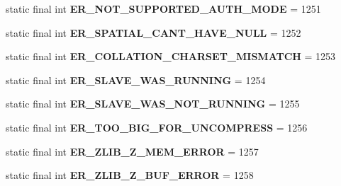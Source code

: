 \begin{DoxyCompactItemize}
static final int {\bfseries E\+R\+\_\+\+N\+O\+T\+\_\+\+S\+U\+P\+P\+O\+R\+T\+E\+D\+\_\+\+A\+U\+T\+H\+\_\+\+M\+O\+DE} = 1251
\item 
\mbox{\label{classcom_1_1mysql_1_1jdbc_1_1_mysql_error_numbers_abda7c74dfb6ad47465f20b53fa1ce1c4}} 
static final int {\bfseries E\+R\+\_\+\+S\+P\+A\+T\+I\+A\+L\+\_\+\+C\+A\+N\+T\+\_\+\+H\+A\+V\+E\+\_\+\+N\+U\+LL} = 1252
\item 
\mbox{\label{classcom_1_1mysql_1_1jdbc_1_1_mysql_error_numbers_a990cec8bba0a643d89e019a4695722cd}} 
static final int {\bfseries E\+R\+\_\+\+C\+O\+L\+L\+A\+T\+I\+O\+N\+\_\+\+C\+H\+A\+R\+S\+E\+T\+\_\+\+M\+I\+S\+M\+A\+T\+CH} = 1253
\item 
\mbox{\label{classcom_1_1mysql_1_1jdbc_1_1_mysql_error_numbers_a852e9c5522c32a5ae36fc8c97eff783a}} 
static final int {\bfseries E\+R\+\_\+\+S\+L\+A\+V\+E\+\_\+\+W\+A\+S\+\_\+\+R\+U\+N\+N\+I\+NG} = 1254
\item 
\mbox{\label{classcom_1_1mysql_1_1jdbc_1_1_mysql_error_numbers_a49cf001169a1bd76103ce96b490795c7}} 
static final int {\bfseries E\+R\+\_\+\+S\+L\+A\+V\+E\+\_\+\+W\+A\+S\+\_\+\+N\+O\+T\+\_\+\+R\+U\+N\+N\+I\+NG} = 1255
\item 
\mbox{\label{classcom_1_1mysql_1_1jdbc_1_1_mysql_error_numbers_a5e5fc0924c5f97a1ca61e66606525abd}} 
static final int {\bfseries E\+R\+\_\+\+T\+O\+O\+\_\+\+B\+I\+G\+\_\+\+F\+O\+R\+\_\+\+U\+N\+C\+O\+M\+P\+R\+E\+SS} = 1256
\item 
\mbox{\label{classcom_1_1mysql_1_1jdbc_1_1_mysql_error_numbers_a4e89dcc658d96c2736462130ce727af9}} 
static final int {\bfseries E\+R\+\_\+\+Z\+L\+I\+B\+\_\+\+Z\+\_\+\+M\+E\+M\+\_\+\+E\+R\+R\+OR} = 1257
\item 
\mbox{\label{classcom_1_1mysql_1_1jdbc_1_1_mysql_error_numbers_a3def9be8cbf38a4d6e1f64e6266eca6e}} 
static final int {\bfseries E\+R\+\_\+\+Z\+L\+I\+B\+\_\+\+Z\+\_\+\+B\+U\+F\+\_\+\+E\+R\+R\+OR} = 1258

\end{DoxyCompactItemize}
